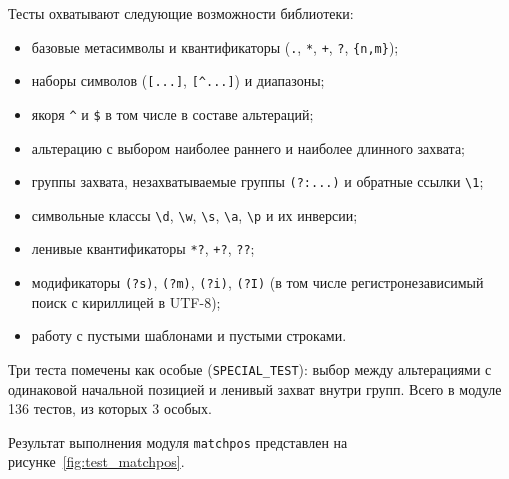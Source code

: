 Тесты охватывают следующие возможности библиотеки:
\begin{itemize}
	\item базовые метасимволы и квантификаторы (\verb`.`, \verb`*`, \verb`+`, \verb`?`, \verb`{n,m}`);
	\item наборы символов (\verb`[...]`, \verb`[^...]`) и диапазоны;
	\item якоря \verb`^` и \verb`$` в том числе в составе альтераций;
	\item альтерацию с выбором наиболее раннего и наиболее длинного захвата;
	\item группы захвата, незахватываемые группы \verb`(?:...)` и обратные ссылки \verb`\1`;
	\item символьные классы \verb`\d`, \verb`\w`, \verb`\s`, \verb`\a`, \verb`\p` и их инверсии;
	\item ленивые квантификаторы \verb`*?`, \verb`+?`, \verb`??`;
	\item модификаторы \verb`(?s)`, \verb`(?m)`, \verb`(?i)`, \verb`(?I)` (в том числе регистронезависимый поиск с кириллицей в UTF-8);
	\item работу с пустыми шаблонами и пустыми строками. 
\end{itemize}

Три теста помечены как особые (\verb`SPECIAL_TEST`): выбор между альтерациями с одинаковой начальной позицией и ленивый захват внутри групп. Всего в модуле 136 тестов, из которых 3 особых.

Результат выполнения модуля \verb`matchpos` представлен на рисунке~\ref{fig:test_matchpos}.

